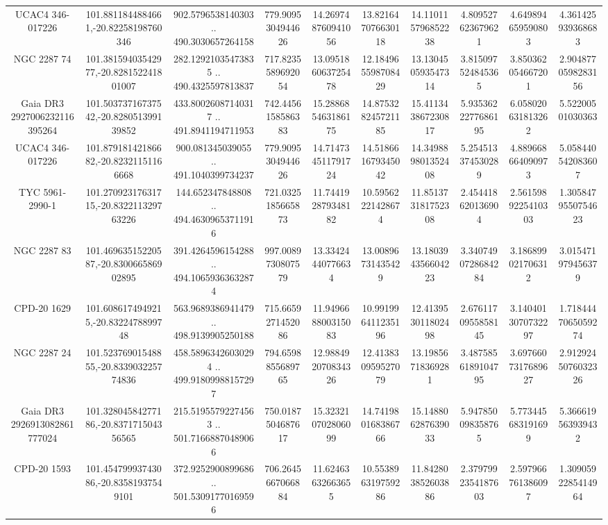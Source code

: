 \begin{table}
\begin{tabular}{cccccccccc}
UCAC4 346-017226 & 101.8811844884661,-20.82258198760346 & 902.5796538140303 .. 490.3030657264158 & 779.9095304944626 & 14.269748760941056 & 13.821647076630118 & 14.110115796852238 & 4.809527623679621 & 4.649894659590803 & 4.361425939368683 \\
NGC  2287    74 & 101.38159403542977,-20.828152241801007 & 282.12921035473835 .. 490.4325597813837 & 717.8235589692054 & 13.095186063725478 & 12.184965598708429 & 13.130450593547314 & 3.815097524845365 & 3.850362054667201 & 2.9048770598283156 \\
Gaia DR3 2927006232116395264 & 101.50373716737542,-20.828051399139852 & 433.80026087140317 .. 491.8941194711953 & 742.4456158586383 & 15.288685463186175 & 14.875328245721185 & 15.411343867230817 & 5.9353622277686195 & 6.058020631813262 & 5.52200501030363 \\
UCAC4 346-017226 & 101.87918142186682,-20.82321151166668 & 900.081345039055 .. 491.1040399734237 & 779.9095304944626 & 14.714734511791724 & 14.518661679345042 & 14.349889801352408 & 5.254513374530289 & 4.889668664090973 & 5.058440542083607 \\
TYC 5961-2990-1 & 101.27092317631715,-20.832211329763226 & 144.652347848808 .. 494.46309653711916 & 721.0325185665873 & 11.744192879348182 & 10.59562221428674 & 11.851373181752308 & 2.454418620136904 & 2.5615989225410303 & 1.3058479550754623 \\
NGC  2287    83 & 101.46963515220587,-20.830066586902895 & 391.4264596154288 .. 494.10659363632874 & 997.0089730807579 & 13.33424440776634 & 13.00896731435429 & 13.180394356604223 & 3.3407490728684284 & 3.186899021706312 & 3.015471979456379 \\
CPD-20  1629 & 101.6086174949215,-20.8322478899748 & 563.9689386941479 .. 498.9139905250188 & 715.6659271452086 & 11.949668800315083 & 10.991996411235196 & 12.413953011802498 & 2.6761170955858145 & 3.1404013070732297 & 1.7184447065059274 \\
NGC  2287    24 & 101.52376901548855,-20.833903225774836 & 458.58963426030294 .. 499.91809988157297 & 794.6598855689765 & 12.988492070834326 & 12.413830959527079 & 13.19856718369281 & 3.4875856189104795 & 3.6976607317689627 & 2.9129245076032326 \\
Gaia DR3 2926913082861777024 & 101.32804584277186,-20.837171504356565 & 215.51955792274563 .. 501.71668870489066 & 750.0187504687617 & 15.323210702806099 & 14.741980168386766 & 15.148806287639033 & 5.947850098358765 & 5.773445683191699 & 5.366619563939432 \\
CPD-20  1593 & 101.45479993743086,-20.83581937549101 & 372.9252900899686 .. 501.53091770169596 & 706.2645667066884 & 11.62463632663655 & 10.553896319759286 & 11.842803852603886 & 2.3797992354187603 & 2.597966761386097 & 1.3090592285414964 \\

\end{tabular}
\end{table}
